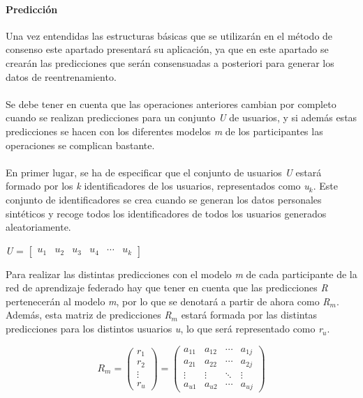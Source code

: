 \paragraph{Predicción} Una vez entendidas las estructuras básicas que se utilizarán en el método de consenso este apartado presentará su aplicación, ya que en este apartado se crearán las predicciones que serán consensuadas a posteriori para generar los datos de reentrenamiento.
\\ \\
Se debe tener en cuenta que las operaciones anteriores cambian por completo cuando se realizan predicciones para un conjunto \textit{U} de usuarios, y si además estas predicciones se hacen con los diferentes modelos \textit{m} de los participantes las operaciones se complican bastante. 
\\ \\
En primer lugar, se ha de especificar que el conjunto de usuarios \textit{U} estará formado por los \textit{k} identificadores de los usuarios, representados como \textit{u$_{k}$}. Este conjunto de identificadores se crea cuando se generan los datos personales sintéticos y recoge todos los identificadores de todos los usuarios generados aleatoriamente.
\begin{center}
    \textit{U} = $\begin{bmatrix} \textit{u$_{1}$} & \textit{u$_{2}$} & \textit{u$_{3}$} & \textit{u$_{4}$} & \cdots & \textit{u$_{k}$} \end{bmatrix}$ 
\end{center}
Para realizar las distintas predicciones con el modelo \textit{m} de cada participante de la red de aprendizaje federado hay que tener en cuenta que las predicciones \textit{R} pertenecerán al modelo \textit{m}, por lo que se denotará a partir de ahora como \textit{R$_{m}$}. Además, esta matriz de predicciones \textit{R$_{m}$} estará formada por las distintas predicciones para los distintos usuarios \textit{u}, lo que será representado como \textit{r$_{u}$}.
\begin{center}
    \[  \textit{R$_{m}$} = 
        \begin{pmatrix}
            \textit{r$_{1}$}  \\ 
            \textit{r$_{2}$}  \\ 
            \vdots  \\ 
            \textit{r$_{u}$}
        \end{pmatrix} 
        =
        \begin{pmatrix}
            a_{11}  &  a_{12}  &  \cdots   & a_{1j} \\ 
            a_{21}  &  a_{22}  &  \cdots   & a_{2j}\\ 
            \vdots  &  \vdots  &  \ddots & \vdots  \\ 
            a_{u1}  &  a_{u2}  &  \cdots   & a_{uj}
        \end{pmatrix}
    \]
\end{center}
\newpage
